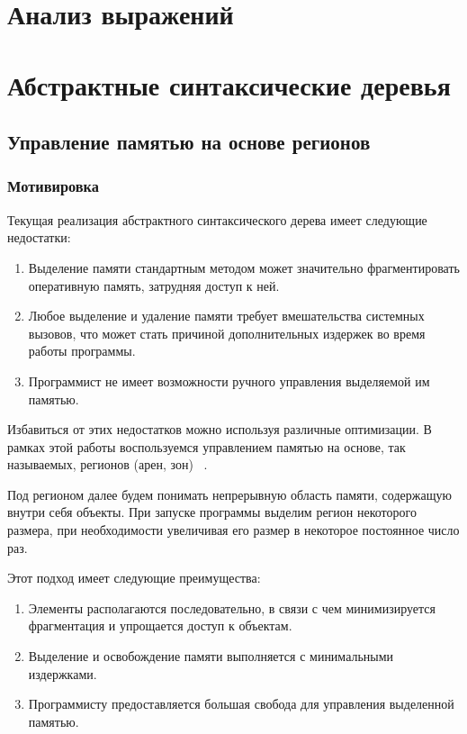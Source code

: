 \documentclass[bachelor, och, coursework]{SCWorks}
\begin{document}
\section*{Анализ выражений}

\section{Абстрактные синтаксические деревья}
\subsection{Управление памятью на основе регионов}
\subsubsection{Мотивировка}

Текущая реализация абстрактного синтаксического дерева имеет 
следующие недостатки:

\begin{enumerate}
    \item Выделение памяти стандартным методом может значительно 
    фрагментировать оперативную память, затрудняя доступ к ней.
    \item Любое выделение и удаление памяти требует вмешательства 
    системных вызовов, что может стать причиной дополнительных 
    издержек во время работы программы.
    \item Программист не имеет возможности ручного управления 
    выделяемой им памятью.
\end{enumerate}

Избавиться от этих недостатков можно используя различные оптимизации. 
В рамках этой работы воспользуемся управлением памятью на основе, так
называемых, регионов (арен, зон) ~\cite{D_C_A_Wang_Princeton_University_2002}.

Под регионом далее будем понимать непрерывную область памяти, 
содержащую внутри себя объекты. При запуске программы выделим 
регион некоторого размера, при необходимости увеличивая его 
размер в некоторое постоянное число раз.

Этот подход имеет следующие преимущества:


\begin{enumerate}
    \item Элементы располагаются последовательно, в связи 
    с чем минимизируется фрагментация и упрощается доступ к 
    объектам.
    \item Выделение и освобождение памяти выполняется с 
    минимальными издержками.
    \item Программисту предоставляется большая свобода для 
    управления выделенной памятью.
\end{enumerate}
\end{document}
